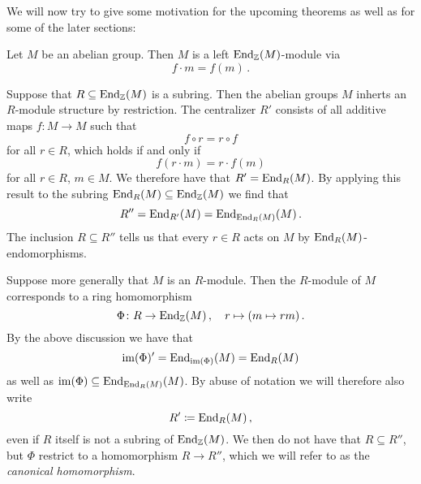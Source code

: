 \begin{fluff}
  We will now try to give some motivation for the upcoming theorems as well as for some of the later sections:
  
  Let $M$ be an abelian group.
  Then $M$ is a left $\operatorname{End}_{\mathbb{Z}}(M)$-module via
  \[
      f \cdot m
    = f(m) \,.
  \]
  
  Suppose that $R \subseteq \operatorname{End}_{\mathbb{Z}}(M)$ is a subring.
  Then the abelian groups $M$ inherts an $R$-module structure by restriction.
  The centralizer $R'$ consists of all additive maps $f \colon M \to M$ such that
  \[
    f \circ r = r \circ f
  \]
  for all $r \in R$, which holds if and only if
  \[
    f(r \cdot m) = r \cdot f(m)
  \]
  for all $r \in R$, $m \in M$.
  We therefore have that $R' = \operatorname{End}_R(M)$.
  By applying this result to the subring $\operatorname{End}_R(M) \subseteq \operatorname{End}_{\mathbb{Z}}(M)$ we find that
  \[
      R'' 
    = \operatorname{End}_{R'}(M)
    = \operatorname{End}_{\operatorname{End}_R(M)}(M) \,.
  \]
  The inclusion $R \subseteq R''$ tells us that every $r \in R$ acts on $M$ by $\operatorname{End}_R(M)$-endomorphisms.
  
  Suppose more generally that $M$ is an $R$-module.
  Then the $R$-module of $M$ corresponds to a ring homomorphism
  \[
            \Phi
    \colon  R
    \to     \operatorname{End}_{\mathbb{Z}}(M) \,,
    \quad   r
    \mapsto (m \mapsto rm) \,. 
  \]
  By the above discussion we have that
  \[
      \operatorname{im}(\Phi)'
    = \operatorname{End}_{\operatorname{im}(\Phi)}(M)
    = \operatorname{End}_R(M) 
  \]
  as well as $\operatorname{im}(\Phi) \subseteq \operatorname{End}_{\operatorname{End}_R(M)}(M)$.
  By abuse of notation we will therefore also write
  \[
              R'
    \coloneqq  \operatorname{End}_R(M) \,,
  \]
  even if $R$ itself is not a subring of $\operatorname{End}_{\mathbb{Z}}(M)$.
  We then do not have that $R \subseteq R''$, but $\Phi$ restrict to a homomorphism $R \to R''$, which we will refer to as the \emph{canonical homomorphism}.
  

\end{fluff}

